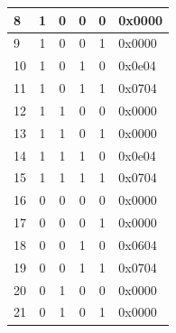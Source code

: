 \begin{table}[]
\begin{tabular}{|l|c|c|c|c|l|}
8                            & 1                       & 0                & 0                & 0                   & 0x0000                         \\ \hline
9                            & 1                       & 0                & 0                & 1                   & 0x0000                         \\ \hline
10                           & 1                       & 0                & 1                & 0                   & 0x0e04                         \\ \hline
11                           & 1                       & 0                & 1                & 1                   & 0x0704                         \\ \hline
12                           & 1                       & 1                & 0                & 0                   & 0x0000                         \\ \hline
13                           & 1                       & 1                & 0                & 1                   & 0x0000                         \\ \hline
14                           & 1                       & 1                & 1                & 0                   & 0x0e04                         \\ \hline
15                           & 1                       & 1                & 1                & 1                   & 0x0704                         \\ \hline
16                           & 0                       & 0                & 0                & 0                   & 0x0000                         \\ \hline
17                           & 0                       & 0                & 0                & 1                   & 0x0000                         \\ \hline
18                           & 0                       & 0                & 1                & 0                   & 0x0604                         \\ \hline
19                           & 0                       & 0                & 1                & 1                   & 0x0704                         \\ \hline
20                           & 0                       & 1                & 0                & 0                   & 0x0000                         \\ \hline
21                           & 0                       & 1                & 0                & 1                   & 0x0000                         \\ \hline

\end{tabular}
\end{table}
